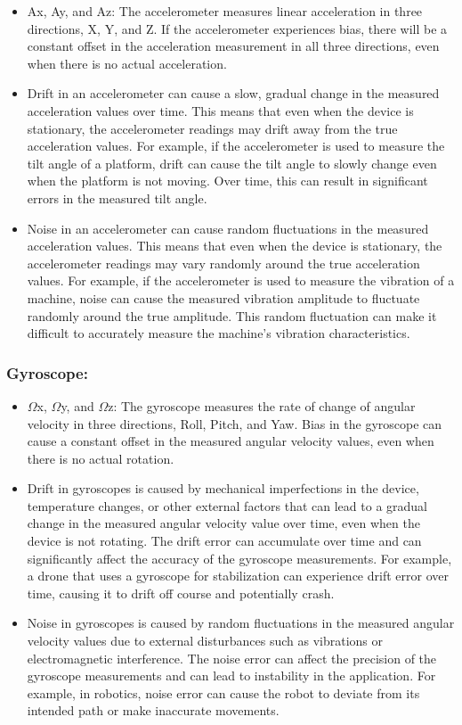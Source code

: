 \begin{itemize}
	\item Ax, Ay, and Az: The accelerometer measures linear acceleration in three directions, X, Y, and Z. If the accelerometer experiences bias, there will be a constant offset in the acceleration measurement in all three directions, even when there is no actual acceleration. 
	\item Drift in an accelerometer can cause a slow, gradual change in the measured acceleration values over time. This means that even when the device is stationary, the accelerometer readings may drift away from the true acceleration values. For example, if the accelerometer is used to measure the tilt angle of a platform, drift can cause the tilt angle to slowly change even when the platform is not moving. Over time, this can result in significant errors in the measured tilt angle.
	\item Noise in an accelerometer can cause random fluctuations in the measured acceleration values. This means that even when the device is stationary, the accelerometer readings may vary randomly around the true acceleration values. For example, if the accelerometer is used to measure the vibration of a machine, noise can cause the measured vibration amplitude to fluctuate randomly around the true amplitude. This random fluctuation can make it difficult to accurately measure the machine's vibration characteristics.
\end{itemize}

\subsubsection{Gyroscope:}
\begin{itemize}
	\item $\Omega$x, $\Omega$y, and $\Omega$z: The gyroscope measures the rate of change of angular velocity in three directions, Roll, Pitch, and Yaw. Bias in the gyroscope can cause a constant offset in the measured angular velocity values, even when there is no actual rotation. \cite{Noureldin:2013}
	\item Drift in gyroscopes is caused by mechanical imperfections in the device, temperature changes, or other external factors that can lead to a gradual change in the measured angular velocity value over time, even when the device is not rotating. The drift error can accumulate over time and can significantly affect the accuracy of the gyroscope measurements. For example, a drone that uses a gyroscope for stabilization can experience drift error over time, causing it to drift off course and potentially crash.
	\item Noise in gyroscopes is caused by random fluctuations in the measured angular velocity values due to external disturbances such as vibrations or electromagnetic interference. The noise error can affect the precision of the gyroscope measurements and can lead to instability in the application. For example, in robotics, noise error can cause the robot to deviate from its intended path or make inaccurate movements.
\end{itemize}

